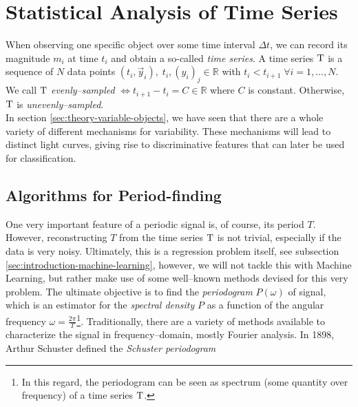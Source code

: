 
\section{Statistical Analysis of Time Series}
\label{sec:statistical-analysis-time-series}

When observing one specific object over some time interval $\Delta t$, we can record its magnitude $m_i$ at time $t_i$ and obtain a so-called \emph{time series}. A time series $\mathrm{T}$ is a sequence of $N$ data points $(t_i, \vec y_i),\; t_i,(y_i)_j \in \mathbb{R}$ with $t_i < t_{i+1} \; \forall i = 1,\ldots,N$. We call $\mathrm{T}$ \emph{evenly--sampled} $\Leftrightarrow t_{i+1} - t_i = C \in \mathbb{R}$ where $C$ is constant. Otherwise, $\mathrm{T}$ is \emph{unevenly--sampled}.\\

In section \ref{sec:theory-variable-objects}, we have seen that there are a whole variety of different mechanisms for variability. These mechanisms will lead to distinct light curves, giving rise to discriminative features that can later be used for classification.


\subsection{Algorithms for Period-finding}
\label{subsec:period-finding}

One very important feature of a periodic signal is, of course, its period $T$. However, reconstructing $T$ from the time series $\mathrm{T}$ is not trivial, especially if the data is very noisy. Ultimately, this is a regression problem itself, see subsection \ref{sec:introduction-machine-learning}, however, we will not tackle this with Machine Learning, but rather make use of some well--known methods devised for this very problem. The ultimate objective is to find the \emph{periodogram} $P(\omega)$ of signal, which is an estimator for the \emph{spectral density} $P$ as a function of the angular frequency $\omega = \frac{2 \pi}{T}$\footnote{In this regard, the periodogram can be seen as spectrum (some quantity over frequency) of a time series $\mathrm{T}$.}. Traditionally, there are a variety of methods available to characterize the signal in frequency--domain, mostly Fourier analysis. In 1898, Arthur Schuster defined the \emph{Schuster periodogram}

